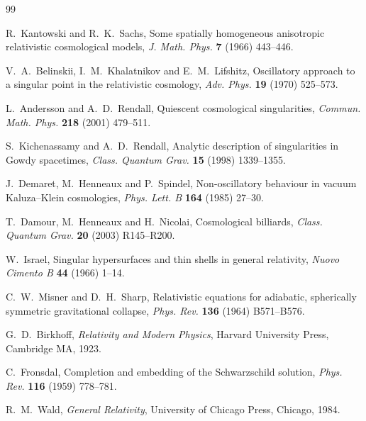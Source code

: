 \documentclass[11pt]{article}
\numberwithin{equation}{section}
\theoremstyle{plain}
\theoremstyle{definition}
\theoremstyle{remark}
\begin{document}
\begin{thebibliography}{99}

 R.~Kantowski and R.~K.~Sachs, Some
spatially homogeneous anisotropic relativistic cosmological models,
\emph{J. Math. Phys.} \textbf{7} (1966) 443--446.

 V.~A.~Belinskii, I.~M.~Khalatnikov and
E.~M.~Lifshitz, Oscillatory approach to a singular point in the
relativistic cosmology, \emph{Adv. Phys.} \textbf{19} (1970)
525--573.

 L.~Andersson and A.~D.~Rendall,
Quiescent cosmological singularities, \emph{Commun. Math. Phys.}
\textbf{218} (2001) 479--511.

 S.~Kichenassamy and A.~D.~Rendall,
Analytic description of singularities in Gowdy spacetimes,
\emph{Class. Quantum Grav.} \textbf{15} (1998) 1339--1355.

 J.~Demaret, M.~Henneaux and
P.~Spindel, Non-oscillatory behaviour in vacuum Kaluza--Klein
cosmologies, \emph{Phys. Lett. B} \textbf{164} (1985) 27--30.

 T.~Damour, M.~Henneaux and
H.~Nicolai, Cosmological billiards, \emph{Class. Quantum Grav.}
\textbf{20} (2003) R145--R200.

 W.~Israel, Singular hypersurfaces and thin
shells in general relativity, \emph{Nuovo Cimento B} \textbf{44}
(1966) 1--14.

 C.~W.~Misner and D.~H.~Sharp, Relativistic
equations for adiabatic, spherically symmetric gravitational
collapse, \emph{Phys. Rev.} \textbf{136} (1964) B571--B576.

 G.~D.~Birkhoff, \emph{Relativity and Modern
Physics}, Harvard University Press, Cambridge MA, 1923.

 C.~Fronsdal, Completion and embedding of the
Schwarzschild solution, \emph{Phys. Rev.} \textbf{116} (1959)
778--781.

 R.~M.~Wald, \emph{General Relativity}, University
of Chicago Press, Chicago, 1984.

\end{thebibliography}
\end{document}
